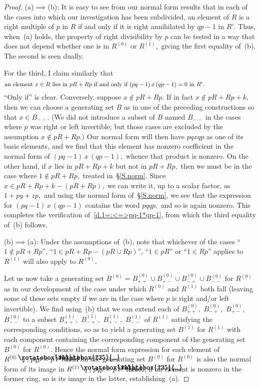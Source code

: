 \documentclass{amsart}
\DeclareRobustCommand{\lang}{\begin{picture}(5,7)
\put(1.2,2.5){\rotatebox{45}{\line(1,0){6.0}}}
\put(1.2,2.5){\rotatebox{315}{\line(1,0){6.0}}}
\end{picture}\kern.16em}
\DeclareRobustCommand{\rang}{\kern.1em\begin{picture}(5,7)
\put(.1,2.5){\rotatebox{135}{\line(1,0){6.0}}}
\put(.1,2.5){\rotatebox{225}{\line(1,0){6.0}}}
\end{picture}}
\begin{document}
\begin{proof}
(a)$\implies$(b):
It is easy to see from our normal form results
that in each of the cases into which our investigation
has been subdivided, an element
of $R$ is a right multiple of $p$ in $R$
if and only if it is right annihilated by $qp-1$ in $R'.$
Thus, when~(a) holds, the property of
right divisibility by $p$ can be tested in a way that does
not depend whether one is in $R^{(0)}$ or $R^{(1)},$ giving the first
equality of~(b).
The second is seen dually.

For the third, I claim similarly that
\begin{equation}\begin{minipage}[c]{35pc}\label{d.1=:<=>pq-1*qp-1}
an element $x\in R$ lies in $pR+Rp$
if and only if $(pq-1)\,x\,(qp-1)=0$ in $R'.$
\end{minipage}\end{equation}
``Only if'' is clear.
Conversely, suppose $x\notin pR+Rp.$
If in fact $x\notin pR+Rp+k,$ then we can choose a generating set $B$
as in one of the preceding constructions so that $x\in B_{--}.$
(We did not introduce a subset of $B$ named $B_{--}$
in the cases where $p$ was
right or left invertible; but those cases are excluded
by the assumption $x\notin pR+Rp.)$
Our normal form will then have $pqxqp$ as one of its basis
elements, and we find that this element has nonzero coefficient in the
normal form of $(pq-1)\,x\,(qp-1),$ whence that product is nonzero.
On the other hand, if $x$ lies in $pR+Rp+k$ but not in $pR+Rp,$
then we must be in the case where $1\notin pR+Rp,$
treated in~\S\ref{S.norm}.
Since $x\in pR+Rp+k-(pR+Rp),$ we can write
it, up to a scalar factor, as $1+py+zp,$
and using the normal form of~\S\ref{S.norm}, we see
that the expression for $(pq-1)\,x\,(qp-1)$ contains the
word $pqqp,$ and so is again nonzero.
This completes the verification of~\eqref{d.1=:<=>pq-1*qp-1},
from which the third equality of~(b) follows.

(b)$\implies$(a):
Under the assumptions of~(b), note that whichever of the cases
``$1\notin pR+Rp$'', ``$1\in pR+Rp-(pR\cup Rp)$'',
``$1\in pR$'' or ``$1\in Rp$''
applies to $R^{(1)}$ will also apply to $R^{(0)}.$

Let us now take a generating set $B^{(0)}=
B_{++}^{(0)}\cup B_{+-}^{(0)} \cup B_{-+}^{(0)}\cup B_{--}^{(0)}$
for $R^{(0)}$ as in our development of the case under which
$R^{(0)}$ and $R^{(1)}$ both fall (leaving some of
these sets empty if we are in the case where $p$ is right
and/or left invertible).
We find using~(b) that we can extend each of
$B_{++}^{(0)},$ $B_{-+}^{(0)},$ $B_{+-}^{(0)},$ $B_{--}^{(0)}$
to a subset
$B_{++}^{(1)},$ $B_{-+}^{(1)},$ $B_{+-}^{(1)},$ $B_{--}^{(1)}$
of $R^{(1)}$ satisfying the corresponding conditions,
so as to yield a generating
set $B^{(1)}$ for $R^{(1)}$ with each component
containing the corresponding component of the generating
set $B^{(0)}$ for $R^{(0)}.$
Hence the normal form expression
for each element of $R^{(0)}\lang q\mid pqp=p\rang$
based on the generating set $B^{(0)}$ for $R^{(0)}$
is also the normal form of its image in
$R^{(1)}\lang q\mid pqp=p\rang.$
Hence, if an element is nonzero in the former
ring, so is its image in the latter, establishing~(a).
\end{proof}
\end{document}
